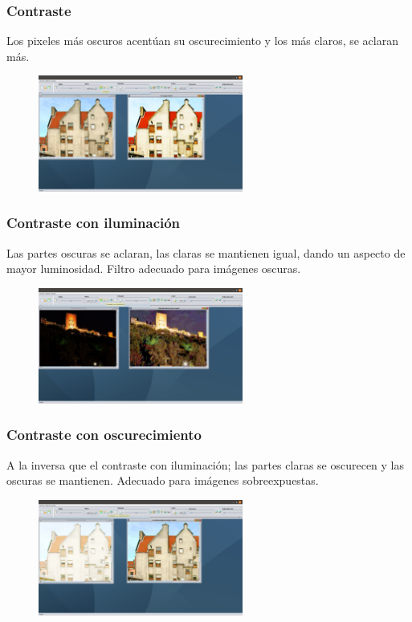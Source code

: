 \documentclass[11pt,a4paper]{article}
\begin{document}
\subsubsection{Contraste}
Los pixeles más oscuros acentúan su oscurecimiento y los más claros, se aclaran más.

\begin{figure}[H]
\centering
	\includegraphics[width=0.6\textwidth]{img/contraste.png}
\end{figure}

\subsubsection{Contraste con iluminación}
Las partes oscuras se aclaran, las claras se mantienen igual, dando un aspecto de mayor luminosidad. Filtro adecuado para imágenes oscuras.

\begin{figure}[H]
\centering
	\includegraphics[width=0.6\textwidth]{img/conilu.png}
\end{figure}

\subsubsection{Contraste con oscurecimiento}
A la inversa que el contraste con iluminación; las partes claras se oscurecen y las oscuras se mantienen. Adecuado para imágenes sobreexpuestas.

\begin{figure}[H]
\centering
	\includegraphics[width=0.6\textwidth]{img/conoscu.png}
\end{figure}
\end{document}

